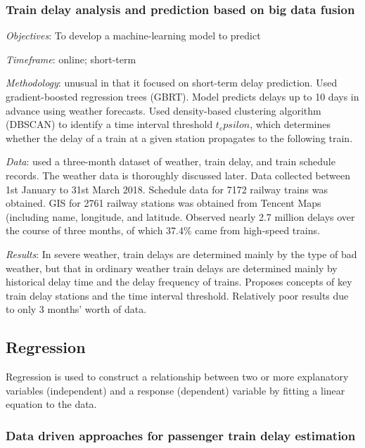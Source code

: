 \documentclass{article}
\begin{document}
\subsubsection{Train delay analysis and prediction based on big data fusion \cite{wang_et_al_2019}}

\textit{Objectives}: To develop a machine-learning model to predict 

\smallskip

\textit{Timeframe}: online; short-term

\smallskip

\textit{Methodology}: unusual in that it focused on short-term delay prediction. Used gradient-boosted regression trees (GBRT). Model predicts delays up to 10 days in advance using weather forecasts. Used density-based clustering algorithm (DBSCAN) to identify a time interval threshold $t_epsilon$, which determines whether the delay of a train at a given station propagates to the following train.  

\smallskip

\textit{Data}: used a three-month dataset of weather, train delay, and train schedule records. The weather data is thoroughly discussed later. Data collected between 1st January to 31st March 2018.
Schedule data for 7172 railway trains was obtained. GIS for 2761 railway stations was obtained from Tencent Maps (including name, longitude, and latitude. Observed nearly 2.7 million delays over the course of three months, of which 37.4\% came from high-speed trains. 

\smallskip

\textit{Results}: In severe weather, train delays are determined mainly by the type of bad weather, but that in ordinary weather train delays are determined mainly by historical delay time and the delay frequency of trains. Proposes concepts of key train delay stations and the time interval threshold. Relatively poor results due to only 3 months' worth of data.

\subsection{Regression}

Regression is used to construct a relationship between two or more explanatory variables (independent) and a response (dependent) variable by fitting a linear equation to the data. 

\subsubsection{Data driven approaches for passenger train delay estimation \cite{wang_work_2015}}
\end{document}
